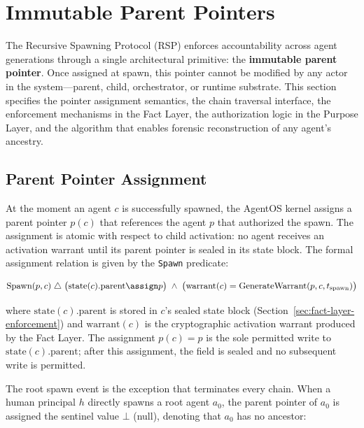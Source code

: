 \section{Immutable Parent Pointers}\label{sec:immutable-parent-pointers}

The Recursive Spawning Protocol (RSP) enforces accountability across agent generations through a single architectural primitive: the \textbf{immutable parent pointer}. Once assigned at spawn, this pointer cannot be modified by any actor in the system—parent, child, orchestrator, or runtime substrate. This section specifies the pointer assignment semantics, the chain traversal interface, the enforcement mechanisms in the Fact Layer, the authorization logic in the Purpose Layer, and the algorithm that enables forensic reconstruction of any agent's ancestry.

\subsection{Parent Pointer Assignment}\label{sec:parent-pointer-assignment}

At the moment an agent $c$ is successfully spawned, the AgentOS kernel assigns a parent pointer $p(c)$ that references the agent $p$ that authorized the spawn. The assignment is atomic with respect to child activation: no agent receives an activation warrant until its parent pointer is sealed in its state block. The formal assignment relation is given by the \texttt{Spawn} predicate:

\begin{equation}
\text{Spawn}(p, c) \;\triangle\; \bigl( \text{state}(c).\text{parent} \assign p \bigr) \;\land\; \bigl( \text{warrant}(c) = \text{GenerateWarrant}(p, c, t_{\text{spawn}}) \bigr)
\end{equation}

where $\text{state}(c).\text{parent}$ is stored in $c$'s sealed state block (Section~\ref{sec:fact-layer-enforcement}) and $\text{warrant}(c)$ is the cryptographic activation warrant produced by the Fact Layer. The assignment $p(c) = p$ is the sole permitted write to $\text{state}(c).\text{parent}$; after this assignment, the field is sealed and no subsequent write is permitted.

The root spawn event is the exception that terminates every chain. When a human principal $h$ directly spawns a root agent $a_0$, the parent pointer of $a_0$ is assigned the sentinel value $\bot$ (null), denoting that $a_0$ has no ancestor:

